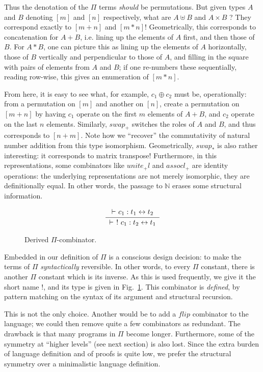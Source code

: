 \documentclass{article}
\newcommand{\identlp}{\ensuremath{\mathit{unite}_+\mathit{l}}}
\newcommand{\swapp}{\ensuremath{\mathit{swap}_+}}
\newcommand{\assoclp}{\ensuremath{\mathit{assocl}_+}}
\newcommand{\swapt}{\ensuremath{\mathit{swap}_*}}
\newcommand{\iso}{\leftrightarrow}
\newcommand{\proves}{\vdash}
\newcommand{\Rule}[4]{
\makebox{{\rm #1}
$\displaystyle
\frac{\begin{array}{l}#2 \\\end{array}}
{\begin{array}{l}#3      \\\end{array}}$
 #4}}
\newcommand{\jdg}[3]{#2 \proves_{#1} #3}
\newcommand{\fin}[1]{\ensuremath{\left[#1\right]}}
\newcommand{\Nat}{\ensuremath{\mathbb{N}}}
\begin{document}
Thus the denotation of the $\Pi$ terms \emph{should} be permutations. But
given types $A$ and $B$ denoting $\fin{m}$ and $\fin{n}$ respectively,
what are $A \uplus B$ and $A \times B$ ?  They correspond exactly to
$\fin{m+n}$ and $\fin{m*n}$!  Geometrically, this corresponds to
concatenation for $A + B$, i.e. lining up the elements of $A$ first,
and then those of $B$. For $A * B$, one can picture this as
lining up the elements of $A$ horizontally, those of $B$ vertically
and perpendicular to those of $A$, and filling in the square with
pairs of elements from $A$ and $B$; if one re-numbers these sequentially,
reading row-wise, this gives an enumeration of $\fin{m*n}$.

From here, it is easy to see what, for example, $c_1 \oplus c_2$ must be,
operationally: from a permutation on $\fin{m}$ and another on $\fin{n}$,
create a permutation on $\fin{m+n}$ by having $c_1$ operate on the first
$m$ elements of $A+B$, and $c_2$ operate on the last $n$ elements.
Similarly, $\swapp$ switches the roles of $A$ and $B$, and thus corresponds
to $\fin{n+m}$. Note how we ``recover'' the commutativity of
natural number addition from this type isomorphism. Geometrically, $\swapt$
is also rather interesting: it corresponds to matrix transpose!
Furthermore, in this representations, some combinators like
$\identlp$ and $\assoclp$ are identity operations: the underlying representations
are not merely isomorphic, they are definitionally equal.
In other words, the passage to $\Nat$ erases some structural information.

\begin{figure}[t]
\[
\Rule{}
{\jdg{}{}{c_1 : t_1 \iso t_2}}
{\jdg{}{}{\ !\ c_1 : t_2 \iso t_1}}
{}
\]
\caption{Derived $\Pi$-combinator.}
\label{derived-pi-combinator}
\end{figure}

Embedded in our definition of $\Pi$ is a conscious design decision: to make the
terms of $\Pi$ \emph{syntactically} reversible. In other words, to
every $\Pi$ constant, there is another $\Pi$ constant which is its
inverse. As this is used frequently, we give it the short name $!$,
and its type is given in Fig.~\ref{derived-pi-combinator}. This
combinator is \emph{defined}, by pattern matching on the syntax of
its argument and structural recursion.

This is not the only choice.  Another would be to add a
$\mathit{flip}$ combinator to the language; we could then remove
quite a few combinators as redundant. The drawback is that many
programs in $\Pi$ become longer. Furthermore, some of the symmetry
at ``higher levels'' (see next section) is also lost. Since the
extra burden of language definition and of proofs is quite low, we
prefer the structural symmetry over a minimalistic language definition.
\end{document}
